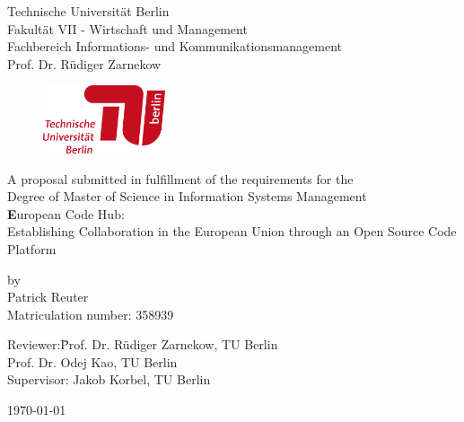 \begin{titlepage}	
\noindent
\begin{minipage}{0.75\textwidth}
{\small
Technische Universit\"at Berlin\\
Fakult\"at VII - Wirtschaft und Management\\
Fachbereich Informations- und Kommunikationsmanagement\\
Prof. Dr. Rüdiger Zarnekow\\
}%
\end{minipage}%
\begin{minipage}{0.25\textwidth}%
\begin{figure}[H]%
{\raggedleft\includegraphics[height=2cm]{images/TU_Logo_lang_RGB_rot.png}}
\end{figure}%
\hfill
\end{minipage}%

\vspace{2cm}

\thispagestyle{empty}
\begin{center}

{\large
A proposal submitted in fulfillment of the requirements for the\\
Degree of Master of Science in Information Systems Management}\\
\vspace{1cm}
{\huge\textbf
European Code Hub:\\
Establishing Collaboration in the European Union through an Open Source Code Platform
}
\vspace{1.2cm}

{\large by\\
	 Patrick Reuter \\
	 Matriculation number: 358939\\[2cm]
}

\begin{minipage}{\linewidth} 
\begin{tabbing}
  		Reviewer:\quad \= Prof. Dr. Rüdiger Zarnekow, TU Berlin\\
                    \> Prof. Dr. Odej Kao, TU Berlin \\[0.3cm]
    	Supervisor:             \> Jakob Korbel, TU Berlin \\
    						         
\end{tabbing}
\end{minipage}

\vspace{1.5cm}
\today{} \\
\end{center}
\thispagestyle{empty}
\newpage
\setcounter{page}{1}
\end{titlepage}

\shipout\null
